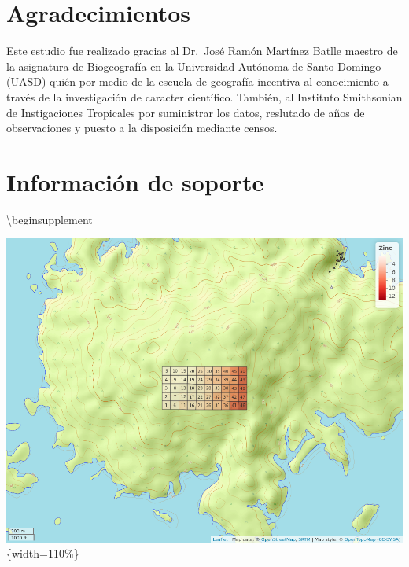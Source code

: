\documentclass[11pt,]{article}
\newenvironment{Shaded}{\begin{snugshade}}{\end{snugshade}}
\newcommand{\NormalTok}[1]{#1}
\begin{document}
\section{Agradecimientos}\label{agradecimientos}

Este estudio fue realizado gracias al Dr.~José Ramón Martínez Batlle
maestro de la asignatura de Biogeografía en la Universidad Autónoma de
Santo Domingo (UASD) quién por medio de la escuela de geografía
incentiva al conocimiento a través de la investigación de caracter
científico. También, al Instituto Smithsonian de Instigaciones
Tropicales por suministrar los datos, reslutado de años de observaciones
y puesto a la disposición mediante censos.

\section{Información de soporte}\label{informaciuxf3n-de-soporte}

\begin{Shaded}
\begin{Highlighting}[]
\NormalTok{\textbackslash{}beginsupplement}
\end{Highlighting}
\end{Shaded}

\includegraphics{mapa_zinc.png} \{width=110\%\}
\end{document}
